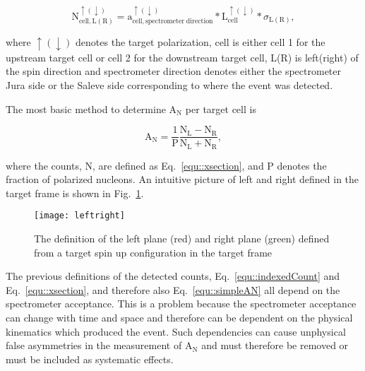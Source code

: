 \begin{equation}
  \label{equ::indexedCount}
  \mathrm{N}^{\uparrow(\downarrow)}_{\mathrm{cell},\mathrm{L(R)}} =
  \mathrm{a}^{\uparrow(\downarrow)}_{\mathrm{cell},\mathrm{spectrometer \;
      direction}} * \mathrm{L}^{\uparrow(\downarrow)}_{\mathrm{cell}} *
  \sigma_{\mathrm{L(R)}},
\end{equation}

\noindent
where $\uparrow(\downarrow)$ denotes the target polarization, cell is either
cell 1 for the upstream target cell or cell 2 for the downstream target cell,
L(R) is left(right) of the spin direction and spectrometer direction denotes
either the spectrometer Jura side or the Saleve side corresponding to where the
event was detected. \par

The most basic method to determine A$_{\mathrm{N}}$ per target cell is

\begin{equation}
  \label{equ::simpleAN}
  \mathrm{A}_{\mathrm{N}} = \frac{1}{\mathrm{P}}
  \frac{\mathrm{N}_{\mathrm{L}} -
    \mathrm{N}_{\mathrm{R}}}{\mathrm{N}_{\mathrm{L}} + \mathrm{N}_{\mathrm{R}}},
\end{equation}

\noindent
where the counts, N, are defined as Eq.~\ref{equ::xsection}, and P denotes the
fraction of polarized nucleons.  An intuitive picture of left and right defined
in the target frame is shown in Fig.~\ref{fig::leftright}.

\begin{figure}[h!t]
  \centering
  \texttt{[image: leftright]}
  \caption{The definition of the left plane (red) and right plane (green)
    defined from a target spin up configuration in the target frame}
  \label{fig::leftright}
\end{figure}

The previous definitions of the detected counts, Eq.~\ref{equ::indexedCount}
and Eq.~\ref{equ::xsection}, and therefore also Eq.~\ref{equ::simpleAN} all
depend on the spectrometer acceptance.  This is a problem because the
spectrometer acceptance can change with time and space and therefore can be
dependent on the physical kinematics which produced the event.  Such
dependencies can cause unphysical false asymmetries in the measurement of
A$_{\mathrm{N}}$ and must therefore be removed or must be included as systematic
effects. \par

